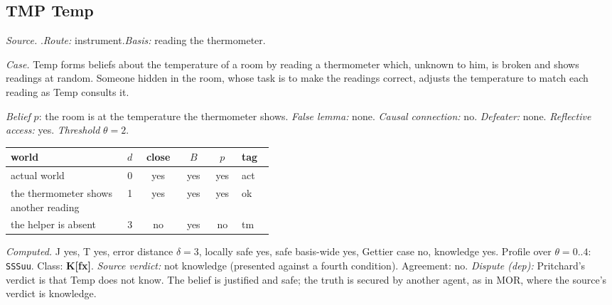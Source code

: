 \subsection*{TMP \enspace Temp}
\noindent\textit{Source.} \citet{Pritchard2012}.\quad \textit{Route:} instrument.\quad \textit{Basis:} reading the thermometer.\par
\noindent\textit{Case.} Temp forms beliefs about the temperature of a room by reading a thermometer which, unknown to him, is broken and shows readings at random. Someone hidden in the room, whose task is to make the readings correct, adjusts the temperature to match each reading as Temp consults it.\par
\noindent\textit{Belief} $p$: the room is at the temperature the thermometer shows.
 \textit{False lemma:} none. \textit{Causal connection:} no. \textit{Defeater:} none. \textit{Reflective access:} yes. \textit{Threshold} $\theta = 2$.\par
\begin{center}\begin{tabular}{@{}p{0.43\linewidth}rcccl@{}}
world & $d$ & close & $B$ & $p$ & tag \\ \midrule
actual world & 0 & yes & yes & yes & act \\
the thermometer shows another reading & 1 & yes & yes & yes & ok \\
the helper is absent & 3 & no & yes & no & tm \\
\end{tabular}\end{center}
\noindent\textit{Computed.} J yes, T yes, error distance $\delta = 3$, locally safe yes, safe basis-wide yes, Gettier case no, knowledge yes. Profile over $\theta = 0..4$: \texttt{SSSuu}. Class: \textbf{K[fx]}.
 \textit{Source verdict:} not knowledge (presented against a fourth condition). Agreement: no.
 \textit{Dispute (dep):} Pritchard's verdict is that Temp does not know. The belief is justified and safe; the truth is secured by another agent, as in MOR, where the source's verdict is knowledge.
\par\medskip
{}
